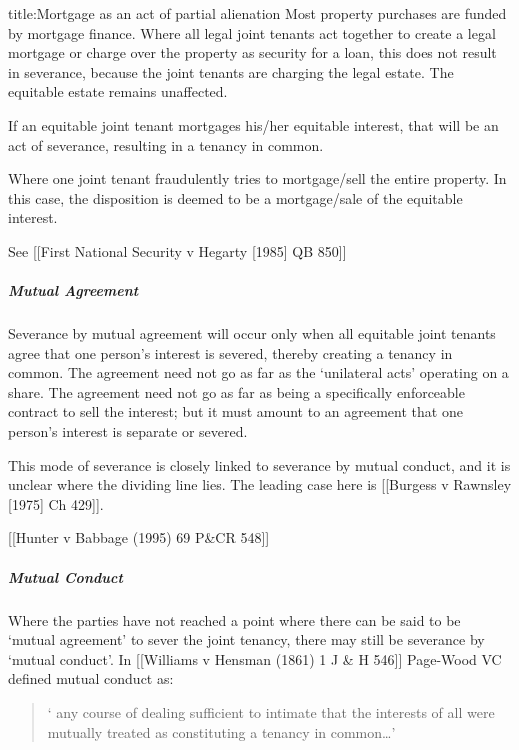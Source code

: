 \documentclass[
]{article}
\newenvironment{Shaded}{}{}
\newcommand{\NormalTok}[1]{#1}
\begin{document}
\begin{Shaded}
\begin{Highlighting}[]
\NormalTok{title:Mortgage as an act of partial alienation}
\NormalTok{Most property purchases are funded by mortgage finance. Where all legal joint tenants act together to create a legal mortgage or charge over the property as security for a loan, this does not result in severance, because the joint tenants are charging the legal estate. The equitable estate remains unaffected.}

\NormalTok{If an equitable joint tenant mortgages his/her equitable interest, that will be an act of severance, resulting in a tenancy in common.}

\NormalTok{Where one joint tenant fraudulently tries to mortgage/sell the entire property. In this case, the disposition is deemed to be a mortgage/sale of the equitable interest.}
\end{Highlighting}
\end{Shaded}

See {[}{[}First National Security v Hegarty {[}1985{]} QB 850{]}{]}

\hypertarget{mutual-agreement}{%
\subparagraph{Mutual Agreement}\label{mutual-agreement}}

Severance by mutual agreement will occur only when all equitable joint
tenants agree that one person's interest is severed, thereby creating a
tenancy in common. The agreement need not go as far as the `unilateral
acts' operating on a share. The agreement need not go as far as being a
specifically enforceable contract to sell the interest; but it must
amount to an agreement that one person's interest is separate or
severed.

This mode of severance is closely linked to severance by mutual conduct,
and it is unclear where the dividing line lies. The leading case here is
{[}{[}Burgess v Rawnsley {[}1975{]} Ch 429{]}{]}.

{[}{[}Hunter v Babbage (1995) 69 P\&CR 548{]}{]}

\hypertarget{mutual-conduct}{%
\subparagraph{Mutual Conduct}\label{mutual-conduct}}

Where the parties have not reached a point where there can be said to be
`mutual agreement' to sever the joint tenancy, there may still be
severance by `mutual conduct'. In {[}{[}Williams v Hensman (1861) 1 J \&
H 546{]}{]} Page-Wood VC defined mutual conduct as:

\begin{quote}
` any course of dealing sufficient to intimate that the interests of all
were mutually treated as constituting a tenancy in common\ldots'
\end{quote}
\end{document}

